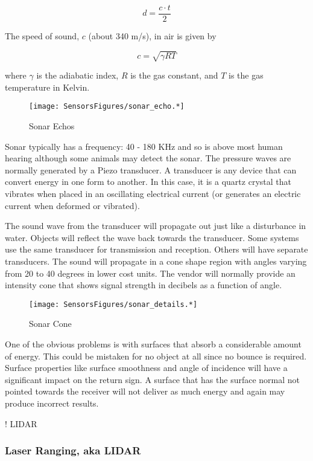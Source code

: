 \[d = \frac{c\cdot t}{2}\]

The speed of sound, \(c\) (about 340 m/s), in air is given by

\[c = \sqrt{\gamma R T}\]

where \(\gamma\) is the adiabatic index, \(R\) is the gas constant, and
\(T\) is the gas temperature in Kelvin.

\begin{figure}
\centering
\texttt{[image: SensorsFigures/sonar\_echo.*]}
\caption{Sonar Echos}
\end{figure}

Sonar typically has a frequency: 40 - 180 KHz and so is above most human
hearing although some animals may detect the sonar. The pressure waves
are normally generated by a Piezo transducer. A transducer is any device
that can convert energy in one form to another. In this case, it is a
quartz crystal that vibrates when placed in an oscillating electrical
current (or generates an electric current when deformed or vibrated).

The sound wave from the transducer will propagate out just like a
disturbance in water. Objects will reflect the wave back towards the
transducer. Some systems use the same transducer for transmission and
reception. Others will have separate transducers. The sound will
propagate in a cone shape region with angles varying from 20 to 40
degrees in lower cost units. The vendor will normally provide an
intensity cone that shows signal strength in decibels as a function of
angle.

\begin{figure}
\centering
\texttt{[image: SensorsFigures/sonar\_details.*]}
\caption{Sonar Cone}
\end{figure}

One of the obvious problems is with surfaces that absorb a considerable
amount of energy. This could be mistaken for no object at all since no
bounce is required. Surface properties like surface smoothness and angle
of incidence will have a significant impact on the return sign. A
surface that has the surface normal not pointed towards the receiver
will not deliver as much energy and again may produce incorrect results.

! LIDAR

\hypertarget{laser-ranging-aka-lidar}{%
\subsubsection{Laser Ranging, aka LIDAR}\label{laser-ranging-aka-lidar}}

